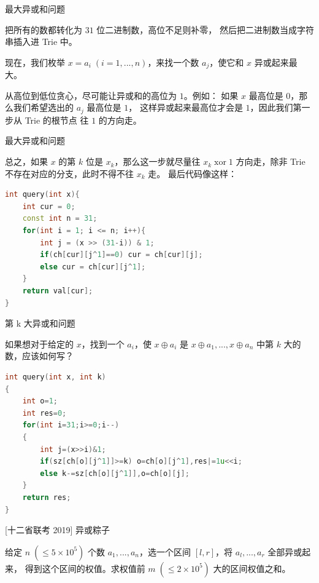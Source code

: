 \documentclass{beamer}
\begin{document}
\begin{frame}{最大异或和问题}
    \small

    把所有的数都转化为 $31$ 位二进制数，高位不足则补零，
    然后把二进制数当成字符串插入进 Trie 中。

    \vspace{1em}\pause
    现在，我们枚举 $x=a_i\;(i=1,...,n)$，来找一个数 $a_j$，使它和 $x$ 异或起来最大。

    \vspace{1em}\pause
    从高位到低位贪心，尽可能让异或和的高位为 $1$。例如：
    如果 $x$ 最高位是 $0$，那么我们希望选出的 $a_j$ 最高位是 $1$，
    这样异或起来最高位才会是 $1$，因此我们第一步从 Trie 的根节点
    往 $1$ 的方向走。
\end{frame}

\begin{frame}[fragile]{最大异或和问题}
    \small

    总之，如果 $x$ 的第 $k$ 位是 $x_{k}$，那么这一步就尽量往 $x_{k}\;\text{xor}\; 1$
    方向走，除非 Trie 不存在对应的分支，此时不得不往 $x_{k}$ 走。
    最后代码像这样：
    \begin{lstlisting}[language=c++]
int query(int x){
    int cur = 0;
    const int n = 31;
    for(int i = 1; i <= n; i++){
        int j = (x >> (31-i)) & 1;
        if(ch[cur][j^1]==0) cur = ch[cur][j];
        else cur = ch[cur][j^1];
    }
    return val[cur];
}
    \end{lstlisting}
\end{frame}

\begin{frame}[fragile]{第 k 大异或和问题}
    \small

    如果想对于给定的 $x$，找到一个 $a_i$，使 $x\oplus a_i$ 是
    $x\oplus a_1,...,x\oplus a_n$ 中第 $k$ 大的数，应该如何写？

    \pause
    \begin{lstlisting}[language=c++]
int query(int x, int k)
{
    int o=1;
    int res=0;
    for(int i=31;i>=0;i--)
    {
        int j=(x>>i)&1;
        if(sz[ch[o][j^1]]>=k) o=ch[o][j^1],res|=1u<<i;
        else k-=sz[ch[o][j^1]],o=ch[o][j];
    }
    return res;
}
    \end{lstlisting}
\end{frame}

\begin{frame}[fragile]{[十二省联考 2019] 异或粽子}
    \small

    给定 $n\;(\leq 5\times 10^5)$ 个数 $a_1,...,a_n$，选一个区间 $[l,r]$，将 $a_l,...,a_r$ 全部异或起来，
    得到这个区间的权值。求权值前 $m\;(\leq 2\times 10^5)$ 大的区间权值之和。
\end{frame}
\end{document}
